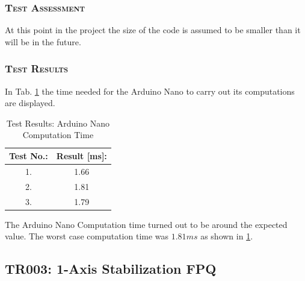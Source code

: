 \subsubsection*{\textsc{\medium Test Assessment}}
At this point in the project the size of the code is assumed to be smaller than it will be in the future. 

\subsubsection*{\textsc{\medium Test Results}}
In Tab. \ref{tab:tabt5} the time needed for the Arduino Nano to carry out its computations are displayed.  
\begin {table}[H]
    \begin{center}
    \caption {Test Results: Arduino Nano Computation Time} 
    \label{tab:tabt5} 
    \begin{tabular}{|c|c|}\hline 
        Test No.: &  Result [ms]:\\ \hline
        1. & 1.66 \\ \hline
        2. & 1.81 \\ \hline
        3. & 1.79 \\ \hline
    \end{tabular}
    \end{center}
\end{table}
\noindent
The Arduino Nano Computation time turned out to be around the expected value. The worst case computation time was $1.81ms$ as shown in \ref{tab:tabt5}. 

\newpage


\subsection{TR003: 1-Axis Stabilization FPQ}
         {}
                         

